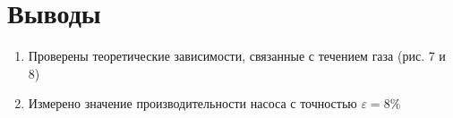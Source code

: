 \documentclass[12pt,a4paper]{article}
\begin{document}
\newpage


\section{Выводы}
\begin{enumerate}
    \item Проверены теоретические зависимости, связанные с течением газа (рис. 7 и 8)
    \item Измерено значение производительности насоса с точностью $\varepsilon = 8\%$
\end{enumerate}
\end{document}

